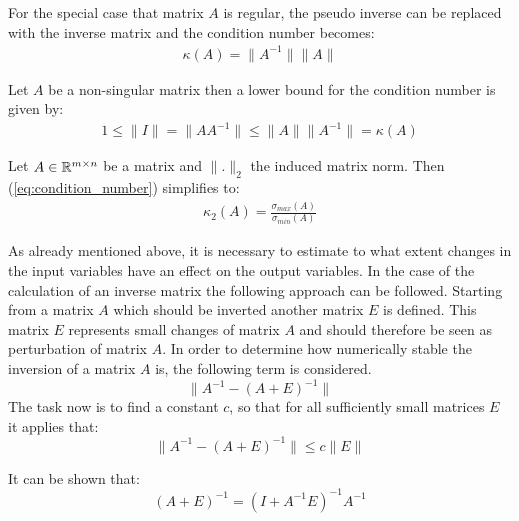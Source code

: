 \begin{remark}
	For the special case that matrix $A$ is regular, the pseudo inverse can be replaced with the inverse matrix and the condition number becomes:
	\begin{align}
	\kappa(A) = \lVert A^{-1} \rVert \lVert A \rVert
	\end{align}	
\end{remark}

\begin{remark}
	Let $A$ be a non-singular matrix then a lower bound for the condition number is given by: 
	\begin{align*}
	 1 \leq \lVert I \rVert = \lVert A A^{-1} \rVert \leq \lVert A \rVert \lVert A^{-1} \rVert = \kappa(A)
	\end{align*}
\end{remark}

\begin{remark}
	Let $A \in \mathbb{R}^{m \times n}$ be a matrix and $\lVert . \rVert_2$ the induced matrix norm. Then (\ref{eq:condition_number}) simplifies to: 
	\begin{align*}
		\kappa_2(A) = \frac{\sigma_{max}(A)}{\sigma_{min}(A)}
	\end{align*}	
\end{remark}

As already mentioned above, it is necessary to estimate to what extent changes in the input variables have an effect on the output variables. In the case of the calculation of an inverse matrix the following approach can be followed. Starting from a matrix $A$ which should be inverted another matrix $E$ is defined. This matrix $E$ represents small changes of matrix $A$ and should therefore be seen as perturbation of matrix $A$. In order to determine how numerically stable the inversion of a matrix $A$ is, the following term is considered.
\begin{equation}\label{eq:stable}
	\lVert A^{-1} - (A + E)^{-1} \rVert
\end{equation}
The task now is to find a constant $c$, so that for all sufficiently small matrices $E$ it applies that:
\begin{equation}
	\lVert A^{-1} - (A + E)^{-1} \rVert \leq c \lVert E \rVert
\end{equation}
 
\begin{remark}\label{eq:simplify}
	It can be shown that:
	\begin{equation*}
		(A + E)^{-1} = (I + A^{-1}E)^{-1}A^{-1}
	\end{equation*}
\end{remark}

